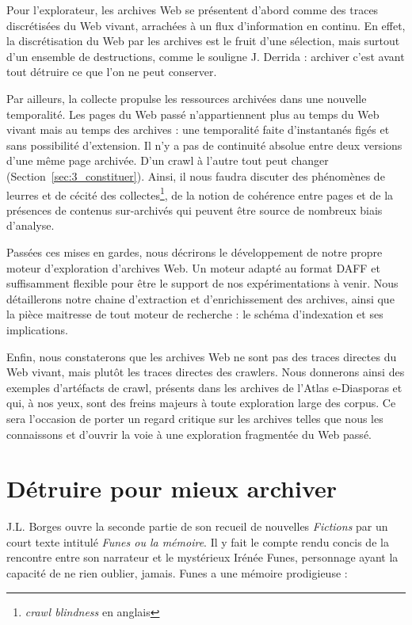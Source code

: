\documentclass[symmetric,justified,marginals=raggedouter]{tufte-book}
\begin{document}
Pour l'explorateur, les archives Web se présentent d'abord comme des traces discrétisées du Web vivant, arrachées à un flux d'information en continu. En effet, la discrétisation du Web par les archives est le fruit d'une sélection, mais surtout d'un ensemble de destructions, comme le souligne J. Derrida \citep[p.60]{derrida_trace_2014} : archiver c'est avant tout détruire ce que l'on ne peut conserver.

Par ailleurs, la collecte propulse les ressources archivées dans une nouvelle temporalité. Les pages du Web passé n'appartiennent plus au temps du Web vivant mais au temps des archives : une temporalité faite d'instantanés figés et sans possibilité d'extension. Il n'y a pas de continuité absolue entre deux versions d'une même page archivée. D'un crawl à l'autre tout peut changer (Section~\ref{sec:3_constituer}). Ainsi, il nous faudra discuter des phénomènes de leurres et de cécité des collectes\footnote{\RaggedOuter \textit{crawl blindness} en anglais}, de la notion de cohérence entre pages et de la présences de contenus sur-archivés qui peuvent être source de nombreux biais d'analyse. 

Passées ces mises en gardes, nous décrirons le développement de notre propre moteur d'exploration d'archives Web. Un moteur adapté au format DAFF et suffisamment flexible pour être le support de nos expérimentations à venir. Nous détaillerons notre chaine d'extraction et d'enrichissement des archives, ainsi que la pièce maitresse de tout moteur de recherche : le schéma d'indexation et ses implications. 

Enfin, nous constaterons que les archives Web ne sont pas des traces directes du Web vivant, mais plutôt les traces directes des crawlers. Nous donnerons ainsi des exemples d'artéfacts de crawl, présents dans les archives de l'Atlas e-Diasporas et qui, à nos yeux, sont des freins majeurs à toute exploration large des corpus. Ce sera l'occasion de porter un regard critique sur les archives telles que nous les connaissons et d'ouvrir la voie à une exploration fragmentée du Web passé.\\


\section{Détruire pour mieux archiver}
\label{sec:4_derrida}

\noindent J.L. Borges ouvre la seconde partie de son recueil de nouvelles \textit{Fictions} \citep{borges_fictions_1974} par un court texte intitulé \textit{Funes ou la mémoire}. Il y fait le compte rendu concis de la rencontre entre son narrateur et le mystérieux Irénée Funes, personnage ayant la capacité de ne rien oublier, jamais. Funes a une mémoire prodigieuse : \\
\end{document}
